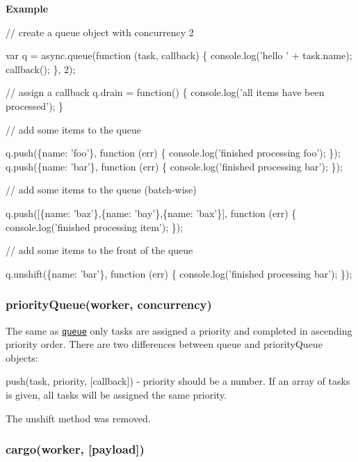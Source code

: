 {\bfseries Example}


\begin{DoxyCode}
// create a queue object with concurrency 2

var q = async.queue(function (task, callback) \{
    console.log('hello ' + task.name);
    callback();
\}, 2);


// assign a callback
q.drain = function() \{
    console.log('all items have been processed');
\}

// add some items to the queue

q.push(\{name: 'foo'\}, function (err) \{
    console.log('finished processing foo');
\});
q.push(\{name: 'bar'\}, function (err) \{
    console.log('finished processing bar');
\});

// add some items to the queue (batch-wise)

q.push([\{name: 'baz'\},\{name: 'bay'\},\{name: 'bax'\}], function (err) \{
    console.log('finished processing item');
\});

// add some items to the front of the queue

q.unshift(\{name: 'bar'\}, function (err) \{
    console.log('finished processing bar');
\});
\end{DoxyCode}






\label{_priorityQueue}%
 \subsubsection*{priority\+Queue(worker, concurrency)}

The same as \href{#queue}{\tt {\ttfamily queue}} only tasks are assigned a priority and completed in ascending priority order. There are two differences between {\ttfamily queue} and {\ttfamily priority\+Queue} objects\+:


\begin{DoxyItemize}
\item {\ttfamily push(task, priority, \mbox{[}callback\mbox{]})} -\/ {\ttfamily priority} should be a number. If an array of {\ttfamily tasks} is given, all tasks will be assigned the same priority.
\item The {\ttfamily unshift} method was removed. 


\end{DoxyItemize}

\label{_cargo}%
 \subsubsection*{cargo(worker, \mbox{[}payload\mbox{]})}


